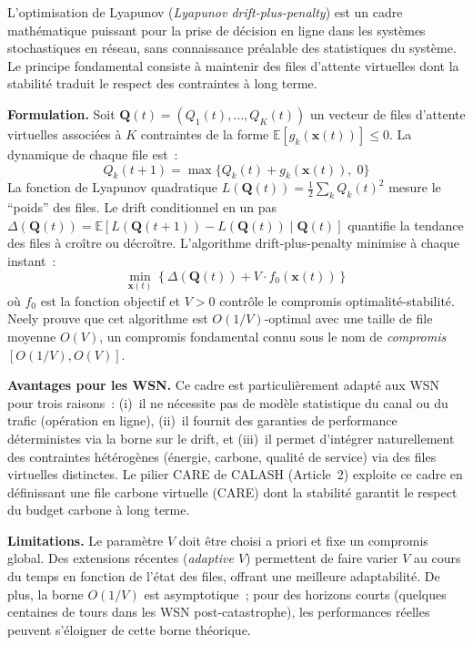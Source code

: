 L'optimisation de Lyapunov (\emph{Lyapunov drift-plus-penalty}) \cite{neely2010lyapunov} est un cadre mathématique puissant pour la prise de décision en ligne dans les systèmes stochastiques en réseau, sans connaissance préalable des statistiques du système. Le principe fondamental consiste à maintenir des files d'attente virtuelles dont la stabilité traduit le respect des contraintes à long terme.

\textbf{Formulation.} Soit $\mathbf{Q}(t) = (Q_1(t), \ldots, Q_K(t))$ un vecteur de files d'attente virtuelles associées à $K$ contraintes de la forme $\mathbb{E}[g_k(\mathbf{x}(t))] \leq 0$. La dynamique de chaque file est~:
\begin{equation}\label{eq:virtual-queue}
    Q_k(t+1) = \max\{Q_k(t) + g_k(\mathbf{x}(t)),\; 0\}
\end{equation}
La fonction de Lyapunov quadratique $L(\mathbf{Q}(t)) = \frac{1}{2}\sum_k Q_k(t)^2$ mesure le ``poids'' des files. Le drift conditionnel en un pas $\Delta(\mathbf{Q}(t)) = \mathbb{E}[L(\mathbf{Q}(t+1)) - L(\mathbf{Q}(t)) \mid \mathbf{Q}(t)]$ quantifie la tendance des files à croître ou décroître. L'algorithme drift-plus-penalty minimise à chaque instant~:
\begin{equation}\label{eq:dpp-general}
    \min_{\mathbf{x}(t)} \left\{ \Delta(\mathbf{Q}(t)) + V \cdot f_0(\mathbf{x}(t)) \right\}
\end{equation}
où $f_0$ est la fonction objectif et $V > 0$ contrôle le compromis optimalité-stabilité. Neely \cite{neely2010lyapunov} prouve que cet algorithme est $O(1/V)$-optimal avec une taille de file moyenne $O(V)$, un compromis fondamental connu sous le nom de \emph{compromis $[O(1/V), O(V)]$}.

\textbf{Avantages pour les WSN.} Ce cadre est particulièrement adapté aux WSN pour trois raisons~: (i)~il ne nécessite pas de modèle statistique du canal ou du trafic (opération en ligne), (ii)~il fournit des garanties de performance déterministes via la borne sur le drift, et (iii)~il permet d'intégrer naturellement des contraintes hétérogènes (énergie, carbone, qualité de service) via des files virtuelles distinctes. Le pilier CARE de CALASH (Article~2) exploite ce cadre en définissant une file carbone virtuelle (CARE) dont la stabilité garantit le respect du budget carbone à long terme.

\textbf{Limitations.} Le paramètre $V$ doit être choisi a priori et fixe un compromis global. Des extensions récentes (\emph{adaptive $V$}) permettent de faire varier $V$ au cours du temps en fonction de l'état des files, offrant une meilleure adaptabilité. De plus, la borne $O(1/V)$ est asymptotique~; pour des horizons courts (quelques centaines de tours dans les WSN post-catastrophe), les performances réelles peuvent s'éloigner de cette borne théorique.


